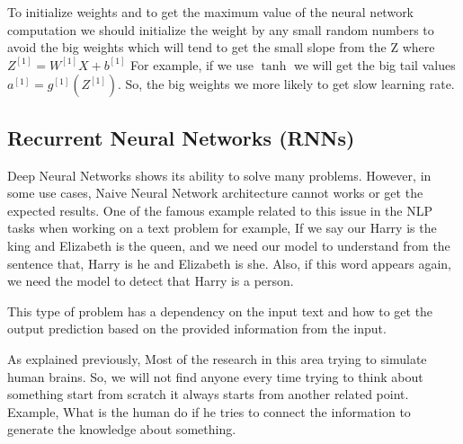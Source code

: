 To initialize weights and to get the maximum value of the neural network computation we should initialize the weight by any small random numbers to avoid the big weights which will tend to get the small slope from the Z where $Z^{[1]}= W^{[1]} X + b^{[1]}$ For example, if we use $\tanh$ we will get the big tail values $a^{[1]}= g^{[1]}(Z^{[1]})$. So, the big weights we more likely to get slow learning rate. 
  


\subsection{Recurrent Neural Networks (RNNs)}\label{sec_RNN}

Deep Neural Networks shows its ability to solve many problems. However, in some use cases, Naive Neural Network architecture cannot works or get the expected results. One of the famous example related to this issue in the NLP tasks when working on a text problem for example, If we say our Harry is the king and Elizabeth is the queen, and we need our model to understand from the sentence that, Harry is he and Elizabeth is she. Also, if this word appears again, we need the model to detect that Harry is a person.

This type of problem has a dependency on the input text and how to get the output prediction based on the provided information from the input.

As explained previously, Most of the research in this area trying to simulate human brains. So, we will not find anyone every time trying to think about something start from scratch it always starts from another related point. Example, What is the human do if he tries to connect the information to generate the knowledge about something.


